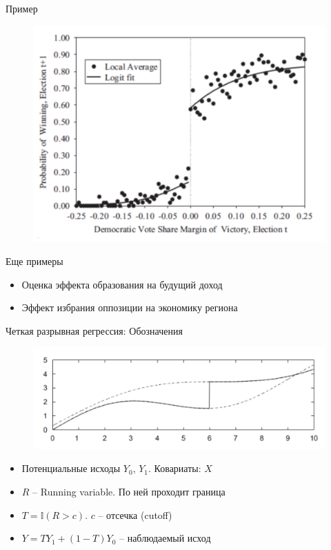 \begin{frame}{Пример}
    \begin{figure}
        \centering
        \includegraphics[width=\textwidth]{Lecture_Sources/Images/rdd_votes.png}
    \end{figure}
\end{frame}

\begin{frame}{Еще примеры}

\begin{itemize}
    \item Оценка эффекта образования на будущий доход
    \item Эффект избрания оппозиции на экономику региона
\end{itemize}

\end{frame}


\begin{frame}{Четкая разрывная регрессия: Обозначения}
    \begin{figure}
        \centering
        \includegraphics[width=\textwidth]{Images/sharp.png}
    \end{figure}
    \begin{itemize}
        \item Потенциальные исходы $Y_0$, $Y_1$. Ковариаты: $X$
        \item $R$ -- Running variable. По ней проходит граница
        \item $T = \mathbb{I}(R > c)$. $c$ -- отсечка (cutoff)
        \item $Y = TY_1 + (1-T)Y_0$ -- наблюдаемый исход
    \end{itemize}
\end{frame}

